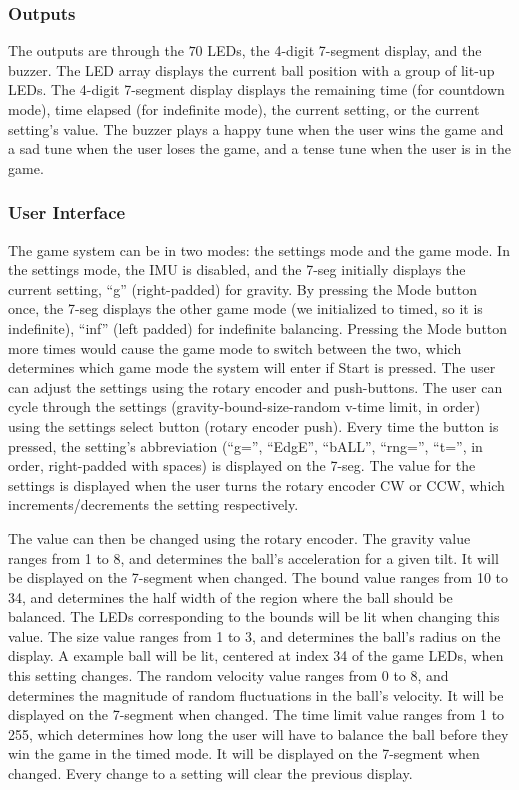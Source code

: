 \documentclass[12pt]{article}
\begin{document}
\subsubsection*{Outputs}
The outputs are through the $70$ LEDs, the 4-digit 7-segment display, and the buzzer. The LED array displays the current ball position with a group of lit-up LEDs. The 4-digit 7-segment display displays the remaining time (for countdown mode), time elapsed (for indefinite mode), the current setting, or the current setting's value. The buzzer plays a happy tune when the user wins the game and a sad tune when the user loses the game, and a tense tune when the user is in the game.

\subsubsection*{User Interface}
The game system can be in two modes: the settings mode and the game mode. In the settings mode, the IMU is disabled, and the 7-seg initially displays the current setting, ``g'' (right-padded) for gravity. By pressing the Mode button once, the 7-seg displays the other game mode (we initialized to timed, so it is indefinite), ``inf'' (left padded) for indefinite balancing. Pressing the Mode button more times would cause the game mode to switch between the two, which determines which game mode the system will enter if Start is pressed. The user can adjust the settings using the rotary encoder and push-buttons. The user can cycle through the settings (gravity-bound-size-random v-time limit, in order) using the settings select button (rotary encoder push). Every time the button is pressed, the setting's abbreviation (``g='', ``EdgE'', ``bALL'', ``rng='', ``t='', in order, right-padded with spaces) is displayed on the 7-seg.
The value for the settings is displayed when the user turns the rotary encoder CW or CCW, which increments/decrements the setting respectively. 

The value can then be changed using the rotary encoder. The gravity value ranges from 1 to 8, and determines the ball's acceleration for a given tilt. It will be displayed on the 7-segment when changed. The bound value ranges from 10 to 34, and determines the half width of the region where the ball should be balanced. The LEDs corresponding to the bounds will be lit when changing this value. The size value ranges from 1 to 3, and determines the ball's radius on the display. A example ball will be lit, centered at index 34 of the game LEDs, when this setting changes. The random velocity value ranges from 0 to 8, and determines the magnitude of random fluctuations in the ball's velocity. It will be displayed on the 7-segment when changed. The time limit value ranges from 1 to 255, which determines how long the user will have to balance the ball before they win the game in the timed mode. It will be displayed on the 7-segment when changed. Every change to a setting will clear the previous display.
\end{document}
